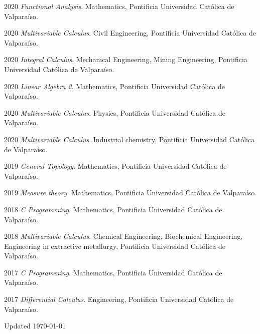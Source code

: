 \documentclass[12pt,letterpaper]{report}
\begin{document}
    \begin{tablist}

        \item[2020] \tab \emph{Functional Analysis}. Mathematics, Pontificia Universidad Cat\'olica de Valpara\'iso. 
            
        \item[2020] \tab \emph{Multivariable Calculus}. Civil Engineering, Pontificia Universidad Cat\'olica de Valpara\'iso. 
            
        \item[2020] \tab \emph{Integral Calculus}. Mechanical Engineering, Mining Engineering, Pontificia Universidad Cat\'olica de Valpara\'iso. 
            
        \item[2020] \tab \emph{Linear Algebra 2}. Mathematics, Pontificia Universidad Cat\'olica de Valpara\'iso.
            
        \item[2020] \tab \emph{Multivariable Calculus}. Physics, Pontificia Universidad Cat\'olica de Valpara\'iso. 
            
        \item[2020] \tab \emph{Multivariable Calculus}. Industrial chemistry, Pontificia Universidad Cat\'olica de Valpara\'iso. 
        
        \item[2019] \tab \emph{General Topology}. Mathematics, Pontificia Universidad Cat\'olica de Valpara\'iso. 
            
        \item[2019] \tab \emph{Measure theory}. Mathematics, Pontificia Universidad Cat\'olica de Valpara\'iso. 
            
        \item[2018] \tab \emph{C Programming}. Mathematics, Pontificia Universidad Cat\'olica de Valpara\'iso. 
            
        \item[2018] \tab \emph{Multivariable Calculus}. Chemical Engineering, Biochemical Engineering, Engineering in extractive metallurgy, Pontificia Universidad Cat\'olica de Valpara\'iso. 
         

        \item[2017] \tab \emph{C Programming}. Mathematics, Pontificia Universidad Cat\'olica de Valpara\'iso. 
            
        \item[2017] \tab \emph{Differential Calculus}. Engineering, Pontificia Universidad Cat\'olica de Valpara\'iso. 

    \end{tablist}
    \begin{center}
        \vfill
        Updated \monthyeardate\today
    \end{center}
\end{document}
